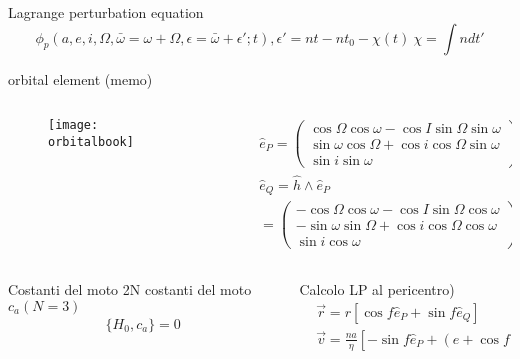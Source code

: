 \begin{wordonframe}{Lagrange perturbation equation}
\begin{equation*}
\phi_p(a,e,i,\Omega,\bar{\omega}=\omega+\Omega,\epsilon=\bar{\omega}+\epsilon';t), \epsilon'=nt-nt_0-\chi(t)\ \chi=\int ndt'
\end{equation*}
\begin{block}{orbital element (memo)}
\begin{columns}  \begin{column}{0.5\textwidth}
\begin{figure}[!ht]\texttt{[image: orbitalbook]}\end{figure}
\end{column} \begin{column}{0.5\textwidth}
\begin{align*}
&\hat{e}_P=\begin{pmatrix}\cos{\Omega}\cos{\omega}-\cos{I}\sin{\Omega}\sin{\omega}\\\sin{\omega}\cos{\Omega}+\cos{i}\cos{\Omega}\sin{\omega}\\\sin{i}\sin{\omega}\end{pmatrix}\\
&\hat{e}_Q=\hat{h}\wedge\hat{e}_P\\
&=\begin{pmatrix}-\cos{\Omega}\cos{\omega}-\cos{I}\sin{\Omega}\cos{\omega}\\-\sin{\omega}\sin{\Omega}+\cos{i}\cos{\Omega}\cos{\omega}\\\sin{i}\cos{\omega}\end{pmatrix}
\end{align*}
\end{column}  \end{columns}
\end{block}
\begin{columns}[T]\begin{column}{0.5\textwidth}
\begin{block}{Costanti del moto}
2N costanti del moto $c_a (N=3)$
\begin{align*}
\{H_0,c_a\}=0
\end{align*}
\end{block}
\end{column}\begin{column}{0.5\textwidth}
\begin{block}{Calcolo LP al pericentro)}
\begin{align*}
&\vec{r}=r[\cos{f}\hat{e}_P+\sin{f}\hat{e}_Q]\\
&\vec{v}=\frac{na}{\eta}[-\sin{f}\hat{e}_P+(e+\cos{f})\hat{e}_Q]
\end{align*}
\end{block}
\end{column}\end{columns}
\end{wordonframe}

